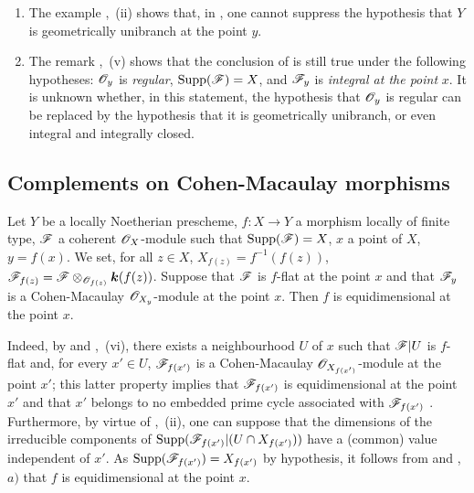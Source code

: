 \begin{remarks}[15.3.4]
\label{IV.15.3.4}
\begin{enumerate}[label=(\roman*)]
  \item The example ,~(ii) shows that, in , one cannot suppress the hypothesis that $Y$ is geometrically unibranch at the point $y$.
  \item The remark ,~(v) shows that the conclusion of  is still true under the following hypotheses: $\mathscr{O}_y$ is \emph{regular}, $\operatorname{Supp}(\mathscr{F})=X$, and $\mathscr{F}_y$ is \emph{integral at the point} $x$.
It is unknown whether, in this statement, the hypothesis that $\mathscr{O}_y$ is regular can be replaced by the hypothesis that it is geometrically unibranch, or even integral and integrally closed.
\end{enumerate}
\end{remarks}

\subsection{Complements on Cohen-Macaulay morphisms}
\label{subsection:IV.15.4}

\begin{proposition}[15.4.1]
\label{IV.15.4.1}
Let $Y$ be a locally Noetherian prescheme, $f:X\to Y$ a morphism locally of finite type, $\mathscr{F}$ a coherent $\mathscr{O}_X$-module such that $\operatorname{Supp}(\mathscr{F})=X$, $x$ a point of $X$, $y=f(x)$.
We set, for all $z\in X$, $X_{f(z)}=f^{-1}(f(z))$, $\mathscr{F}_{f(z)}=\mathscr{F}\otimes_{\mathscr{O}_{f(z)}}\boldsymbol{k}(f(z))$.
Suppose that $\mathscr{F}$ is $f$-flat at the point $x$ and that $\mathscr{F}_y$ is a Cohen-Macaulay $\mathscr{O}_{X_y}$-module at the point $x$.
Then $f$ is
equidimensional at the point $x$.
\end{proposition}

Indeed, by  and ,~(vi), there exists a neighbourhood $U$ of $x$ such that $\mathscr{F}|U$ is $f$-flat and, for every $x'\in U$, $\mathscr{F}_{f(x')}$ is a Cohen-Macaulay $\mathscr{O}_{X_{f(x')}}$-module at the point $x'$; this latter property implies that $\mathscr{F}_{f(x')}$ is equidimensional at the point $x'$ and that $x'$ belongs to no embedded prime cycle associated with $\mathscr{F}_{f(x')}$ .
Furthermore, by virtue of ,~(ii), one can suppose that the dimensions of the irreducible components of $\operatorname{Supp}(\mathscr{F}_{f(x')}|(U\cap X_{f(x')}))$ have a (common) value independent of $x'$.
As $\operatorname{Supp}(\mathscr{F}_{f(x')})=X_{f(x')}$ by hypothesis, it follows from  and ,~$a)$ that $f$ is equidimensional at the point $x$.


